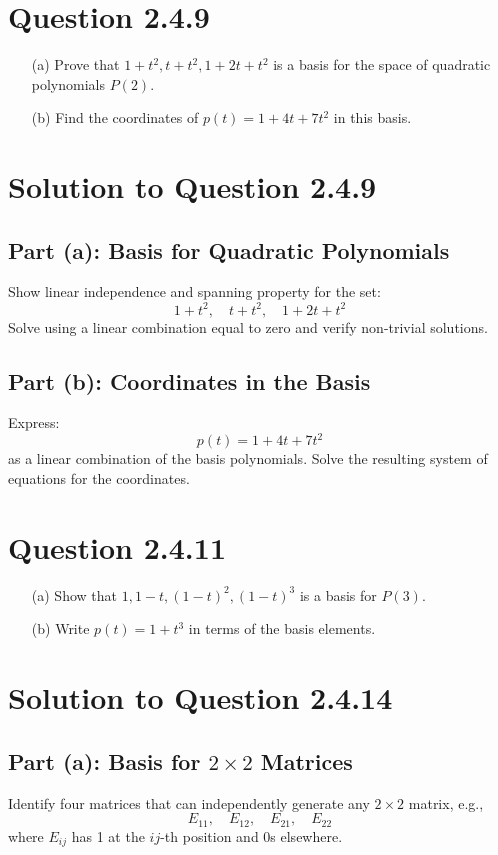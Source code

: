 \documentclass[12pt]{article}
\begin{document}
\newpage
\section*{Question 2.4.9}
\begin{itemize}
    \item[(a)] Prove that \(1 + t^2, t + t^2, 1 + 2t + t^2\) is a basis for the space of quadratic polynomials \(P(2)\).
    \item[(b)] Find the coordinates of \(p(t) = 1 + 4t + 7t^2\) in this basis.
\end{itemize}

\section*{Solution to Question 2.4.9}

\subsection*{Part (a): Basis for Quadratic Polynomials}
Show linear independence and spanning property for the set:
\[
1 + t^2, \quad t + t^2, \quad 1 + 2t + t^2
\]
Solve using a linear combination equal to zero and verify non-trivial solutions.

\subsection*{Part (b): Coordinates in the Basis}
Express:
\[
p(t) = 1 + 4t + 7t^2
\]
as a linear combination of the basis polynomials. Solve the resulting system of equations for the coordinates.



\newpage
\section*{Question 2.4.11}
\begin{itemize}
    \item[(a)] Show that \(1, 1 - t, (1 - t)^2, (1 - t)^3\) is a basis for \(P(3)\).
    \item[(b)] Write \(p(t) = 1 + t^3\) in terms of the basis elements.
\end{itemize}

\section*{Solution to Question 2.4.14}

\subsection*{Part (a): Basis for \(2 \times 2\) Matrices}
Identify four matrices that can independently generate any \(2 \times 2\) matrix, e.g.,
\[
E_{11}, \quad E_{12}, \quad E_{21}, \quad E_{22}
\]
where \(E_{ij}\) has 1 at the \(ij\)-th position and 0s elsewhere.
\end{document}
